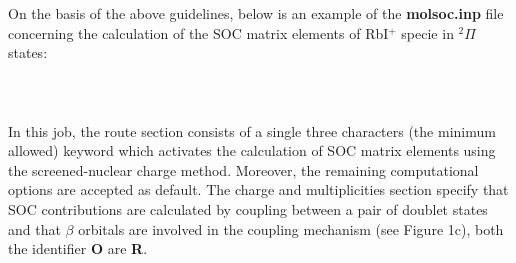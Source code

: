 \documentclass[a4paper,12pt]{article}
\begin{document}
%
\newpage
On the basis of the above guidelines, below is an example of the {\bf molsoc.inp} file concerning the
calculation of the SOC matrix elements of RbI$^+$ specie in $^2\Pi$ states: \\ \\
 \\ \\
%
In this job, the route section consists of a single three characters (the minimum allowed) keyword
which activates the calculation of SOC matrix elements using the 
screened-nuclear charge method\cite{Chiod2}. 
Moreover, the remaining computational options are accepted as default. 
The charge and multiplicities section specify that SOC contributions are calculated by coupling 
between a pair of doublet states and that $\beta$ orbitals are involved in the coupling 
mechanism (see Figure 1c), both the identifier {\bf O} are {\bf R}. 
%
\end{document}
